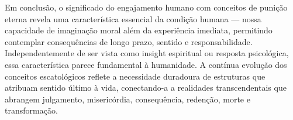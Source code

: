 Em conclusão, o significado do engajamento humano com conceitos de punição eterna revela uma característica essencial da condição humana --- nossa capacidade de imaginação moral além da experiência imediata, permitindo contemplar consequências de longo prazo, sentido e responsabilidade. Independentemente de ser vista como insight espiritual ou resposta psicológica, essa característica parece fundamental à humanidade. A contínua evolução dos conceitos escatológicos reflete a necessidade duradoura de estruturas que atribuam sentido último à vida, conectando-a a realidades transcendentais que abrangem julgamento, misericórdia, consequência, redenção, morte e transformação.


